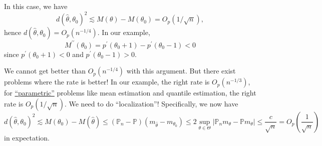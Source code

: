 In this case, we have
\[
	d(\hat{\theta}, \theta _0)^2 \lesssim M(\theta ) - M(\theta _0) = O_p(1 / \sqrt{n} ),
\]
hence \(d(\hat{\theta}, \theta _0) = O_p(n^{-1 / 4})\). In our example,
\[
	M^{\prime\prime} (\theta _0)
	= p^{\prime} (\theta _0 + 1) - p^{\prime} (\theta _0 - 1)
	< 0
\]
since \(p^{\prime} (\theta _0+1) < 0\) and \(p^{\prime} (\theta _0 - 1) > 0\).

We cannot get better than \(O_p(n^{-1 / 4})\) with this argument. But there exist problems where the rate is better! In our example, the right rate is \(O_p(n^{-1 / 3})\), for \hyperref[def:parametric]{``parametric''} problems like mean estimation and quantile estimation, the right rate is \(O_p(1 / \sqrt{n} )\). We need to do ``localization''! Specifically, we now have
\[
	d(\hat{\theta}, \theta _0)^2
	\lesssim M(\theta _0) - M(\hat{\theta} )
	\leq (\mathbb{P} _n - \mathbb{P} ) (m_{\hat{\theta} } - m_{\theta _0})
	\leq 2 \sup _{\theta \in \Theta } \vert \mathbb{P} _n m_\theta - \mathbb{P} m_\theta \vert
	\leq \frac{c}{\sqrt{n} }
	= O_p \left( \frac{1}{\sqrt{n} } \right)
\]
in expectation.


